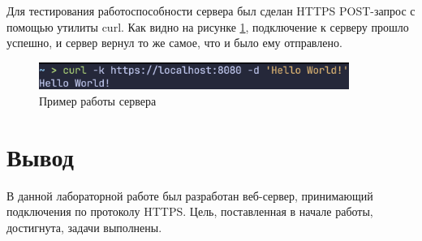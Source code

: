 \documentclass[a4paper, 14pt]{extarticle}
\begin{document}
Для тестирования работоспособности сервера был сделан HTTPS POST-запрос с
помощью утилиты curl. Как видно на рисунке \ref{fig:3}, подключение к серверу
прошло успешно, и сервер вернул то же самое, что и было ему отправлено.

\begin{figure}[H]
  \centering
  \includegraphics[width=0.9\textwidth]{images/3.png}
  \caption{Пример работы сервера}
  \label{fig:3}
\end{figure}

\section{Вывод}

В данной лабораторной работе был разработан веб-сервер, принимающий подключения
по протоколу HTTPS. Цель, поставленная в начале работы, достигнута, задачи
выполнены.
\end{document}
